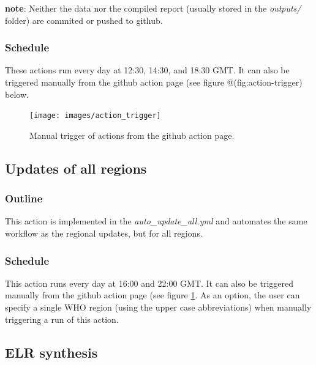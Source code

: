 \documentclass[]{book}
\begin{document}
\textbf{note}: Neither the data nor the compiled report (usually stored in the
\emph{outputs/} folder) are commited or pushed to github.

\hypertarget{schedule}{%
\subsubsection{Schedule}\label{schedule}}

These actions run every day at 12:30, 14:30, and 18:30 GMT. It can also be
triggered manually from the github action page (see figure
@(fig:action-trigger) below.

\begin{figure}

{\centering \texttt{[image: images/action\_trigger]} 

}

\caption{Manual trigger of actions from the github action page.}\label{fig:action-trigger}
\end{figure}

\hypertarget{updates-of-all-regions}{%
\subsection{Updates of all regions}\label{updates-of-all-regions}}

\hypertarget{outline-1}{%
\subsubsection{Outline}\label{outline-1}}

This action is implemented in the \emph{auto\_update\_all.yml} and automates the same
workflow as the regional updates, but for all regions.

\hypertarget{schedule-1}{%
\subsubsection{Schedule}\label{schedule-1}}

This action runs every day at 16:00 and 22:00 GMT. It can also be triggered
manually from the github action page (see figure \ref{fig:action-trigger}. As an
option, the user can specify a single WHO region (using the upper case
abbreviations) when manually triggering a run of this action.

\hypertarget{elr-synthesis}{%
\subsection{ELR synthesis}\label{elr-synthesis}}
\end{document}
